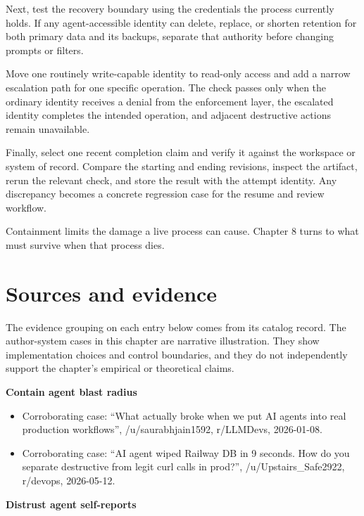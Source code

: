 Next, test the recovery boundary using the credentials the process currently holds. If any agent-accessible identity can delete, replace, or shorten retention for both primary data and its backups, separate that authority before changing prompts or filters.

Move one routinely write-capable identity to read-only access and add a narrow escalation path for one specific operation. The check passes only when the ordinary identity receives a denial from the enforcement layer, the escalated identity completes the intended operation, and adjacent destructive actions remain unavailable.

Finally, select one recent completion claim and verify it against the workspace or system of record. Compare the starting and ending revisions, inspect the artifact, rerun the relevant check, and store the result with the attempt identity. Any discrepancy becomes a concrete regression case for the resume and review workflow.

Containment limits the damage a live process can cause. Chapter 8 turns to what must survive when that process dies.

\section*{Sources and evidence}

The evidence grouping on each entry below comes from its catalog record. The author-system cases in this chapter are narrative illustration. They show implementation choices and control boundaries, and they do not independently support the chapter's empirical or theoretical claims.

\textbf{Contain agent blast radius}

\begin{itemize}
\tightlist
\item
  Corroborating case: ``What actually broke when we put AI agents into real production workflows'', /u/saurabhjain1592, r/LLMDevs, 2026-01-08.
\item
  Corroborating case: ``AI agent wiped Railway DB in 9 seconds. How do you separate destructive from legit curl calls in prod?'', /u/Upstairs\_Safe2922, r/devops, 2026-05-12.
\end{itemize}

\textbf{Distrust agent self-reports}

